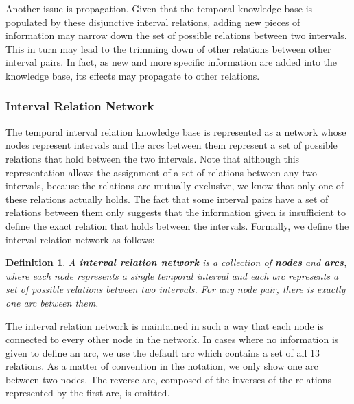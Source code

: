 \documentclass[11pt]{report}
\newtheorem{vdefinition}{Definition}[chapter]
\begin{document}
        Another issue is propagation. Given that the temporal knowledge base
        is populated by these disjunctive interval relations, adding new
        pieces of information may narrow down the set of possible relations
        between two intervals. This in turn may lead to the trimming down of
        other relations between other interval pairs. In fact, as new and more
        specific information are added into the knowledge base, its effects may
        propagate to other relations.

        \subsubsection{Interval Relation Network}

          The temporal interval relation knowledge base is represented as a
          network whose nodes represent intervals and the arcs between them
          represent a set of possible relations that hold between the two
          intervals. Note that although this representation allows the
          assignment of a set of relations between any two intervals, because
          the relations are mutually exclusive, we know that only one of these
          relations actually holds. The fact that some interval pairs have a
          set of relations between them only suggests that the information
          given is insufficient to define the exact relation that holds
          between the intervals. Formally, we define the interval relation
          network as follows:

          \begin{vdefinition}
            \label{def-net}
            A {\bf interval relation network} is a collection of {\bf nodes}
            and {\bf arcs}, where each node represents a single temporal
            interval and each arc represents a set of possible relations
            between two intervals. For any node pair, there is exactly one arc
            between them.
          \end{vdefinition}

          The interval relation network is maintained in such a way that each
          node is connected to every other node in the network. In cases where
          no information is given to define an arc, we use the default arc
          which  contains a set of all 13 relations. As a matter of convention
          in the notation, we only show one arc between two nodes. The reverse
          arc, composed of the inverses of the relations represented by the
          first arc, is omitted.
\end{document}
